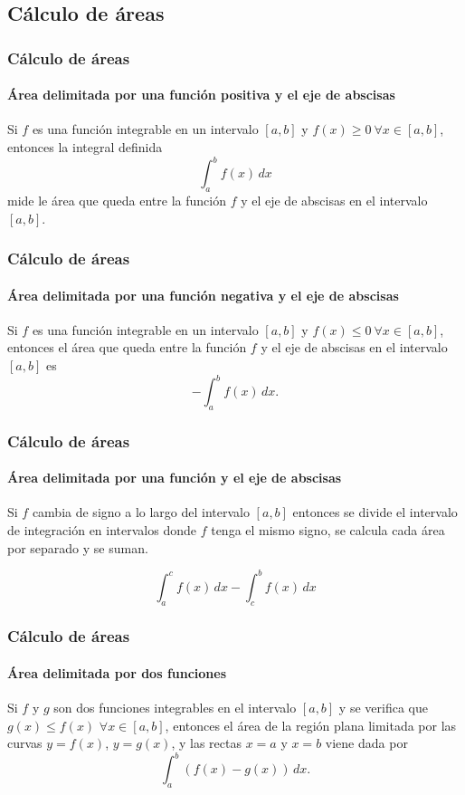 \subsection{Cálculo de áreas}
\begin{frame}
	\frametitle{Cálculo de áreas}
	\framesubtitle{Área delimitada por una función positiva y el eje de abscisas}
	Si $f$ es una función integrable en un intervalo $[a,b]$ y $f(x)\geq 0\ \forall x\in[a,b]$, entonces la integral definida
	\[\int_a^b f(x)\,dx\]
	mide le área que queda entre la función $f$ y el eje de abscisas en el intervalo $[a,b]$.
	\begin{center}
		\scalebox{1}{}
	\end{center}
\end{frame}


\begin{frame}
	\frametitle{Cálculo de áreas}
	\framesubtitle{Área delimitada por una función negativa y el eje de abscisas}
	Si $f$ es una función integrable en un intervalo $[a,b]$ y $f(x)\leq 0\ \forall x\in[a,b]$, entonces el área que queda entre la función $f$ y el eje de abscisas en el intervalo $[a,b]$ es
	\[
		-\int_a^b f(x)\,dx.
	\]
	\begin{center}
		\scalebox{1}{}
	\end{center}
\end{frame}


\begin{frame}
	\frametitle{Cálculo de áreas}
	\framesubtitle{Área delimitada por una función y el eje de abscisas}
	Si $f$ cambia de signo a lo largo del intervalo $[a,b]$ entonces se divide el intervalo de integración en intervalos donde $f$ tenga el mismo signo, se calcula cada área por separado y se suman.
	\begin{center}
		\scalebox{1}{}
	\end{center}
	\[\int_a^c f(x)\,dx -\int_c^b f(x)\,dx\]
\end{frame}


\begin{frame}
	\frametitle{Cálculo de áreas}
	\framesubtitle{Área delimitada por dos funciones}
	Si $f$ y $g$ son dos funciones integrables en el intervalo $[a,b]$ y se
	verifica que $g(x)\leq f(x)$ $\forall x\in[a,b]$, entonces el área de la región
	plana limitada por las curvas $y=f(x)$, $y=g(x)$, y las rectas $x=a$ y $x=b$
	viene dada por
	\[
		\int_{a}^{b}{(f(x)- g(x))\,dx}.
	\]
	
	\begin{center}
		\scalebox{1}{}
	\end{center}
\end{frame}
